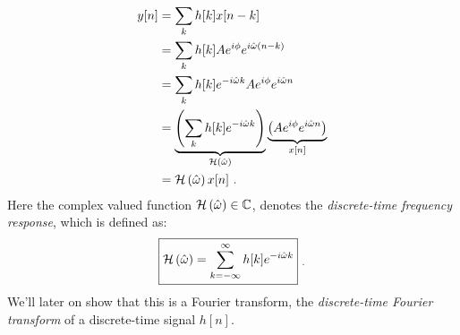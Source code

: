 \begin{align}
y[n] & = \sum_{k} h[k]x[n-k] \\
     & = \sum_{k} h[k] A e^{i\phi} e^{i\hat{\omega}(n-k)} \\
     & = \sum_{k} h[k] e^{-i\hat{\omega}k} A e^{i\phi} e^{i\hat{\omega}n} \\
     & = \underbrace{\left(\sum_{k} h[k] e^{-i\hat{\omega}k}\right)}_{\mathcal{H}\left(\hat{\omega}\right)} \underbrace{\left(A e^{i\phi} e^{i\hat{\omega}n}\right)}_{x[n]} \\
     & = \mathcal{H}\left(\hat{\omega}\right) x[n] \,\,. \label{eq:eig_dt}
\end{align}
Here the complex valued function $\mathcal{H}\left(\hat{\omega}\right) \in \mathbb{C}$, denotes
the \emph{discrete-time frequency response}, which is defined as:
\begin{equation}
\boxed{
\mathcal{H}\left(\hat{\omega}\right) = \sum_{k=-\infty}^{\infty} h[k]e^{-i\hat{\omega}k}
} \,\, _.
\label{eq:dt_fr}
\end{equation}
We'll later on show that this is a Fourier transform,
the \emph{discrete-time Fourier transform} of a discrete-time signal
$h[n]$. %



